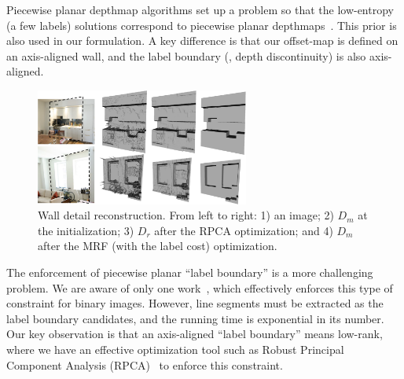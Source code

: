 Piecewise planar depthmap algorithms set up a problem so that the
low-entropy (a few labels) solutions correspond to piecewise planar
depthmaps~\cite{ManhattanWorldStereo,SinhaPlane09,GallupPlanar10}.
This prior is also used in our formulation. A key difference is that our
offset-map is defined on an axis-aligned wall, and the label boundary
(\ie, depth discontinuity) is also axis-aligned.
%
\begin{figure}[!t]
\begin{center}
\includegraphics[width=70mm]{../figures/comp_details.pdf} 
\end{center}
\caption{Wall detail reconstruction. From left to right: 1) an image; 2)
 $D_m$ at the initialization; 3) $D_r$ after the RPCA optimization; and
 4) $D_m$ after the MRF (with the label cost) optimization.
 } \label{fig:comp_details}
 \vspace{-0.325cm}
\end{figure}
%
The enforcement of piecewise planar ``label boundary'' is a more
challenging problem. We are aware of only one
work~\cite{silberman2014contour}, which effectively enforces this type
of constraint for binary images. However, line segments must be
extracted as the label boundary candidates, and the running time is
exponential in its number.
Our key observation is that an axis-aligned ``label boundary'' means
low-rank, where we have an effective optimization tool such as Robust
Principal Component Analysis (RPCA)~\cite{Candes2011} to enforce this
constraint.  

